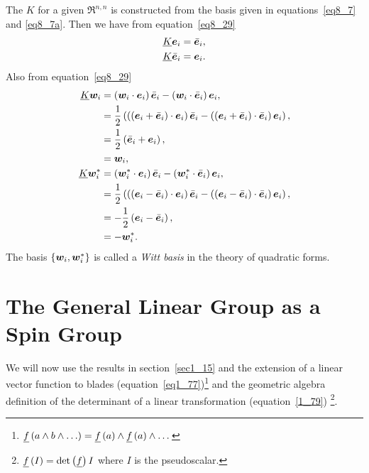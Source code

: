 The $K$ for a given $\Re^{n,n}$ is constructed from the basis given in equations~\ref{eq8_7}
and \ref{eq8_7a}.  Then we have from equation~\ref{eq8_29}
\begin{align}
	\underline{K}\bm{e}_{i} = \bar{\bm{e}}_{i}, \label{eq8_38}\\
	\underline{K}\bar{\bm{e}}_{i} = \bm{e}_{i}. \label{eq8_39}
\end{align}
Also from equation~\ref{eq8_29}
\begin{align}
	\underline{K}\bm{w}_{i} &= \left ( {\bm{w}_{i}\cdot\bm{e}_{i}} \right )\bar{\bm{e}}_{i}
	                        -\left ( {\bm{w}_{i}\cdot\bar{\bm{e}}_{i}} \right )\bm{e}_{i}, \nonumber \\
	                      &= \displaystyle\frac{1}{2}\left ( {\left ( {\left ( {\bm{e}_{i}+\bar{\bm{e}}_{i}} \right )\cdot\bm{e}_{i}} \right )\bar{\bm{e}}_{i}
	                        -\left ( {\left ( {\bm{e}_{i}+\bar{\bm{e}}_{i}} \right )\cdot\bar{\bm{e}}_{i}} \right )\bm{e}_{i}} \right ), \nonumber \\
	                      &= \displaystyle\frac{1}{2}\left ( {\bar{\bm{e}}_{i}+\bm{e}_{i}} \right ), \nonumber \\
	                      &= \bm{w}_{i}, \label{eq8_40}\\
	\underline{K}\bm{w}_{i}^{*} &= \left ( {\bm{w}_{i}^{*}\cdot\bm{e}_{i}} \right )\bar{\bm{e}}_{i}
	                        -\left ( {\bm{w}_{i}^{*}\cdot\bar{\bm{e}}_{i}} \right )\bm{e}_{i}, \nonumber \\
	                      &= \displaystyle\frac{1}{2}\left ( {\left ( {\left ( {\bm{e}_{i}-\bar{\bm{e}}_{i}} \right )\cdot\bm{e}_{i}} \right )\bar{\bm{e}}_{i}
	                        -\left ( {\left ( {\bm{e}_{i}-\bar{\bm{e}}_{i}} \right )\cdot\bar{\bm{e}}_{i}} \right )\bm{e}_{i}} \right ), \nonumber \\
	                      &= -\displaystyle\frac{1}{2}\left ( {\bm{e}_{i}-\bar{\bm{e}}_{i}} \right ), \nonumber \\
	                      &= -\bm{w}_{i}^{*}.\label{eq8_41}	                      
\end{align}
The basis $\left \{ {\bm{w}_{i},\bm{w}_{i}^{*}} \right \}$ is called a {\em Witt basis} in the theory of quadratic forms.

\section{The General Linear Group as a Spin Group}

We will now use the results in section~\ref{sec1_15} and the extension of a linear vector function to 
blades (equation~\ref{eq1_77})\footnote{
${\underline{f}}\left ( {a\wedge b\wedge\dots} \right )={\underline{f}}\left ( {a} \right )\wedge{\underline{f}}\left ( {a} \right )\wedge\dots$}
and the geometric algebra definition of the determinant of a linear
transformation (equation~\ref{1_79})
\footnote{${\underline{f}}\left ( {I} \right ) = {\det}\left ( {\underline{f}} \right ) I$ where $I$ is the pseudoscalar.}.

